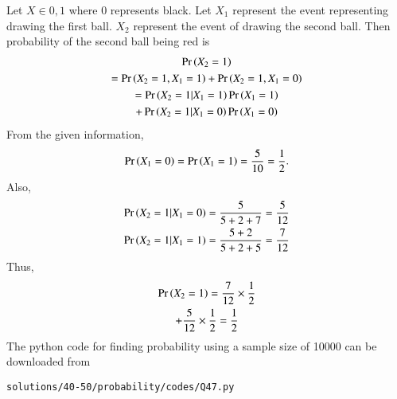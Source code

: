 Let $X \in {0,1}$ where 0 represents black.  Let $X_1$ represent the event representing drawing the first ball. $X_2$ represent the event of drawing the second ball.
Then  probability of the second ball being red is
\begin{multline}
\Pr\left(X_2 = 1\right) 
\\
= \Pr\left(X_2 = 1,X_1 = 1\right)+\Pr\left(X_2 = 1,X_1 = 0\right)
\\
=\Pr\left(X_2 = 1|X_1 = 1\right)\Pr\left(X_1 = 1\right)
\\
+\Pr\left(X_2 = 1|X_1 = 0\right)\Pr\left(X_1 = 0\right)
\end{multline}
From the given information,
\begin{align}
\Pr\left(X_1 = 0\right) = \Pr\left(X_1 = 1\right)
=\frac{5}{10}=\frac{1}{2}.
\end{align}
Also, 
\begin{align}
\Pr\left(X_2 = 1|X_1 = 0\right) &= \frac{5}{5+2+7} = \frac{5}{12}
\\
\Pr\left(X_2 = 1|X_1 = 1\right) &= \frac{5+2}{5+2+5} = \frac{7}{12}
\end{align}
Thus, 
\begin{multline}
\Pr\left(X_2 = 1\right) = \frac{7}{12}\times \frac{1}{2} 
\\
+ \frac{5}{12}\times \frac{1}{2}
=\frac{1}{2}
\end{multline}
 The python code for finding probability using a sample size of 10000 can be downloaded from
\begin{lstlisting}
solutions/40-50/probability/codes/Q47.py
\end{lstlisting}

